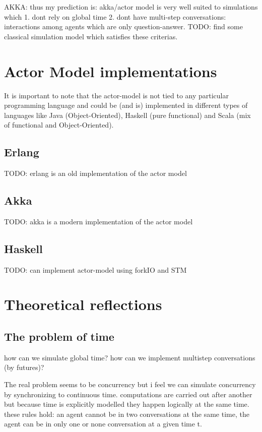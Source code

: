 AKKA: thus my prediction is: akka/actor model is very well suited to simulations which 1. dont rely on global time 2. dont have multi-step conversations: interactions among agents which are only question-answer. TODO: find some classical simulation model which satisfies these criterias.

\section{Actor Model implementations}
It is important to note that the actor-model is not tied to any particular programming language and could be (and is) implemented in different types of languages like Java (Object-Oriented), Haskell (pure functional) and Scala (mix of functional and Object-Oriented).

\subsection{Erlang}
TODO: erlang is an old implementation of the actor model

\subsection{Akka}
TODO: akka is a modern implementation of the actor model

\subsection{Haskell}
TODO: can implement actor-model using forkIO and STM


\section{Theoretical reflections}

\subsection{The problem of time}
how can we simulate global time? how can we implement multistep conversations (by futures)?

The real problem seems to be concurrency but i feel we can simulate concurrency by synchronizing to continuous time. computations are carried out after another but because time is explicitly modelled they happen logically at the same time. these rules hold: an agent cannot be in two conversations at the same time, the agent can be in only one or none conversation at a given time t.

